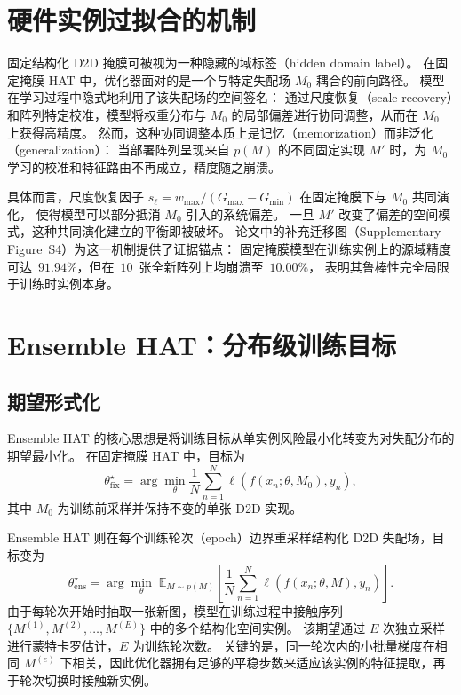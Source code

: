 \section{硬件实例过拟合的机制}

固定结构化 D2D 掩膜可被视为一种隐藏的域标签（hidden domain label）。
在固定掩膜 HAT 中，优化器面对的是一个与特定失配场 $M_0$ 耦合的前向路径。
模型在学习过程中隐式地利用了该失配场的空间签名：
通过尺度恢复（scale recovery）和阵列特定校准，模型将权重分布与 $M_0$ 的局部偏差进行协同调整，从而在 $M_0$ 上获得高精度。
然而，这种协同调整本质上是记忆（memorization）而非泛化（generalization）：
当部署阵列呈现来自 $p(M)$ 的不同固定实现 $M'$ 时，为 $M_0$ 学习的校准和特征路由不再成立，精度随之崩溃。

具体而言，尺度恢复因子 $s_\ell = w_{\max}/(G_{\max}-G_{\min})$ 在固定掩膜下与 $M_0$ 共同演化，
使得模型可以部分抵消 $M_0$ 引入的系统偏差。
一旦 $M'$ 改变了偏差的空间模式，这种共同演化建立的平衡即被破坏。
论文中的补充迁移图（Supplementary Figure~S4）为这一机制提供了证据锚点：
固定掩膜模型在训练实例上的源域精度可达~$91.94\%$，但在~$10$~张全新阵列上均崩溃至~$10.00\%$，
表明其鲁棒性完全局限于训练时实例本身。

\section{Ensemble HAT：分布级训练目标}

\subsection{期望形式化}

Ensemble HAT 的核心思想是将训练目标从单实例风险最小化转变为对失配分布的期望最小化。
在固定掩膜 HAT 中，目标为
\begin{equation}
    \theta_{\mathrm{fix}}^{\star}=\arg\min_{\theta}\frac{1}{N}\sum_{n=1}^{N}\ell\!\left(f(x_{n};\theta,M_{0}),y_{n}\right),
\label{eq:hat-fixed-ch1}
\end{equation}
其中 $M_0$ 为训练前采样并保持不变的单张 D2D 实现。

Ensemble HAT 则在每个训练轮次（epoch）边界重采样结构化 D2D 失配场，目标变为
\begin{equation}
    \theta_{\mathrm{ens}}^{\star}=\arg\min_{\theta}\;\mathbb{E}_{M\sim p(M)}\!\left[\frac{1}{N}\sum_{n=1}^{N}\ell\!\left(f(x_{n};\theta,M),y_{n}\right)\right].
\label{eq:hat-ensemble-ch1}
\end{equation}
由于每轮次开始时抽取一张新图，模型在训练过程中接触序列 $\{M^{(1)},M^{(2)},\dots,M^{(E)}\}$ 中的多个结构化空间实例。
该期望通过 $E$ 次独立采样进行蒙特卡罗估计，$E$ 为训练轮次数。
关键的是，同一轮次内的小批量梯度在相同 $M^{(e)}$ 下相关，因此优化器拥有足够的平稳步数来适应该实例的特征提取，再于轮次切换时接触新实例。

